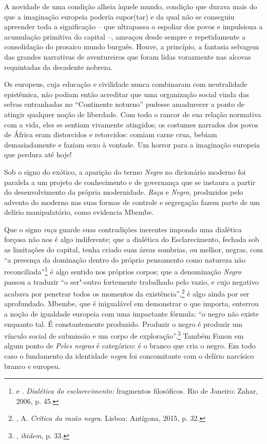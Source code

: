 A novidade de uma condição alheia àquele mundo, condição que durava mais
do que a imaginação europeia poderia supor(tar) e da qual não se
conseguiu apreender toda a significação -- que ultrapassa o espoliar dos
povos e impulsiona a acumulação primitiva do capital --, ameaçou desde
sempre e repetidamente a consolidação do prosaico mundo burguês. Houve,
a princípio, a fantasia selvagem das grandes narrativas de aventureiros
que foram lidas vorazmente nas alcovas requintadas da decadente nobreza.

Os europeus, cuja educação e civilidade nunca combinaram com
neutralidade epistêmica, não podiam então acreditar que uma organização
social vinda das selvas entranhadas no ``Continente noturno'' pudesse
amadurecer a ponto de atingir qualquer noção de liberdade. Com todo o
rancor de sua relação normativa com a vida, eles se sentiam vivamente
atingidos; os costumes narrados dos povos de África eram distorcidos e
retorcidos: comiam carne crua, bebiam demasiadamente e faziam sexo à
vontade. Um horror para a imaginação europeia que perdura até hoje!

Sob o signo do exótico, a aparição do termo \emph{Negro} no dicionário
moderno foi paralela a um projeto de conhecimento e de governança que se
instaura a partir do desenvolvimento da própria modernidade. \emph{Raça}
e \emph{Negro}, produzidos pelo advento do moderno nas suas formas de
controle e segregação fazem parte de um delírio manipulatório, como
evidencia Mbembe.

Que o signo \emph{raça} guarde suas contradições inerentes impondo uma
dialética forçosa não nos é algo indiferente; que a dialética do
Esclarecimento, fechada sob as limitações do capital, tenha criado suas
áreas sombrias, ou melhor, negras, com ``a presença da dominação dentro
do próprio pensamento como natureza não reconciliada''\footnote{ e
  . \emph{Dialética do esclarecimento:} fragmentos
  filosóficos. Rio de Janeiro: Zahar, 2006, p. 45.} é algo sentido nos
próprios corpos; que a denominação \emph{Negro} passou a traduzir ``o
ser"-outro fortemente trabalhado pelo vazio, e cujo negativo acabava por
penetrar todos os momentos da existência'',\footnote{, A.
  \emph{Crítica da razão negra}. Lisboa: Antígona, 2015, p. 32.} é algo
ainda por ser aprofundado. Mbembe, que é inigualável em demonstrar o que
importa, enterrou a noção de igualdade europeia com uma impactante
fórmula: ``o negro não existe enquanto tal. É constantemente produzido.
Produzir o negro é produzir um vínculo social de submissão e um corpo de
exploração''.\footnote{, \emph{ibidem}, p. 33.}
Também Fanon em algum ponto de
\emph{Peles negras} é categórico: é o branco que cria o negro. Em todo
caso o fundamento da identidade \emph{negra} foi concomitante com o
delírio narcísico branco e europeu.


